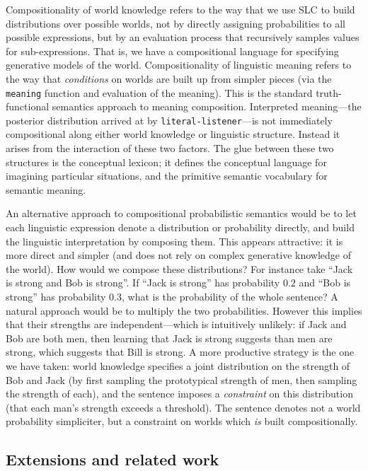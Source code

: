 \documentclass[pdfextras]{handbook}
\begin{document}
Compositionality of world knowledge refers to the way that we use SLC to build distributions over possible worlds, not by directly assigning probabilities to all possible expressions, but by an evaluation process that recursively samples values for sub-expressions. 
That is, we have a compositional language for specifying generative models of the world.
%
Compositionality of linguistic meaning  refers to the way that \emph{conditions} on worlds are built up from simpler pieces (via the \lstinline{meaning} function and evaluation of the meaning). 
This is the standard truth-functional semantics approach to meaning composition.
%
Interpreted meaning---the posterior distribution arrived at by \lstinline{literal-listener}---is not immediately compositional along either world knowledge or linguistic structure. 
Instead it arises from the interaction of these two factors.
The glue between these two structures is the conceptual lexicon; it defines the conceptual language for imagining particular situations, and the primitive semantic vocabulary for semantic meaning.

An alternative approach to compositional probabilistic semantics would be to let each linguistic expression denote a distribution or probability directly, and build the linguistic interpretation by composing them. This appears attractive: it is more direct and simpler (and does not rely on complex generative knowledge of the world). 
How would we compose these distributions? For instance take ``Jack is strong and Bob is strong''. If ``Jack is strong'' has probability $0.2$ and ``Bob is strong'' has probability $0.3$, what is the probability of the whole sentence? 
A natural approach would be to multiply the two probabilities. 
However this implies that their strengths are independent---which is intuitively unlikely: if Jack and Bob are both men, then learning that Jack is strong suggests than men are strong, which suggests that Bill is strong.
A more productive strategy is the one we have taken: world knowledge specifies a joint distribution on the strength of Bob and Jack (by first sampling the prototypical strength of men, then sampling the strength of each), and the sentence imposes a \emph{constraint} on this distribution (that each man's strength exceeds a threshold). 
The sentence denotes not a world probability simpliciter, but a constraint on worlds which \emph{is} built compositionally. 


\subsection{Extensions and related work}
\end{document}
